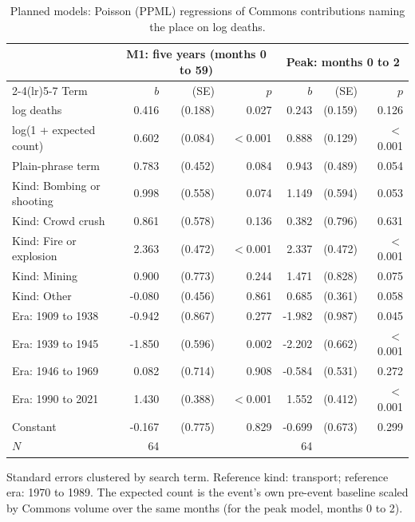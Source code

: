 \documentclass[11pt,a4paper]{article}
\begin{document}
\begin{table}[tbp]\centering\small\begin{threeparttable}\caption{Planned models: Poisson (PPML) regressions of Commons contributions naming the place on log deaths.}\label{tab:main}\begin{tabular}{lrrrrrr}\toprule & \multicolumn{3}{c}{M1: five years (months 0 to 59)} & \multicolumn{3}{c}{Peak: months 0 to 2}\\\cmidrule(lr){2-4}\cmidrule(lr){5-7} Term & $b$ & (SE) & $p$ & $b$ & (SE) & $p$\\\midrule
log deaths & 0.416 & (0.188) & 0.027 & 0.243 & (0.159) & 0.126\\
log(1 + expected count) & 0.602 & (0.084) & $<$0.001 & 0.888 & (0.129) & $<$0.001\\
Plain-phrase term & 0.783 & (0.452) & 0.084 & 0.943 & (0.489) & 0.054\\
Kind: Bombing or shooting & 0.998 & (0.558) & 0.074 & 1.149 & (0.594) & 0.053\\
Kind: Crowd crush & 0.861 & (0.578) & 0.136 & 0.382 & (0.796) & 0.631\\
Kind: Fire or explosion & 2.363 & (0.472) & $<$0.001 & 2.337 & (0.472) & $<$0.001\\
Kind: Mining & 0.900 & (0.773) & 0.244 & 1.471 & (0.828) & 0.075\\
Kind: Other & -0.080 & (0.456) & 0.861 & 0.685 & (0.361) & 0.058\\
Era: 1909 to 1938 & -0.942 & (0.867) & 0.277 & -1.982 & (0.987) & 0.045\\
Era: 1939 to 1945 & -1.850 & (0.596) & 0.002 & -2.202 & (0.662) & $<$0.001\\
Era: 1946 to 1969 & 0.082 & (0.714) & 0.908 & -0.584 & (0.531) & 0.272\\
Era: 1990 to 2021 & 1.430 & (0.388) & $<$0.001 & 1.552 & (0.412) & $<$0.001\\
Constant & -0.167 & (0.775) & 0.829 & -0.699 & (0.673) & 0.299\\
\midrule $N$ & 64 & & & 64 & & \\
\bottomrule\end{tabular}\begin{tablenotes}\footnotesize\item Standard errors clustered by search term. Reference kind: transport; reference era: 1970 to 1989. The expected count is the event's own pre-event baseline scaled by Commons volume over the same months (for the peak model, months 0 to 2).\end{tablenotes}\end{threeparttable}\end{table}
\end{document}
